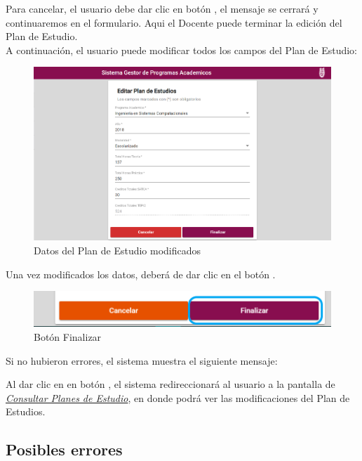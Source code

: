 Para cancelar, el usuario debe dar clic en botón  , el mensaje se cerrará y continuaremos en el formulario. Aqui el Docente puede terminar la edición del Plan de Estudio.\\
A continuación, el usuario puede modificar todos los campos del Plan de Estudio:
\begin{figure}[!hbtp]
	\centering
	\hypertarget{modif}{\includegraphics[width=0.7\linewidth]{images/SP4-GPE/editarPE}}
	\caption{Datos del Plan de Estudio modificados}
	\label{modif}
\end{figure}

Una vez modificados los datos, deberá de dar clic en el botón  .
\begin{figure}[!hbtp]
	\centering
	\hypertarget{btnfin}{\includegraphics[width=0.7\linewidth]{images/SP4-GPE/editarPER}}
	\caption{Botón Finalizar}
	\label{btnfin}
\end{figure}

Si no hubieron errores, el sistema muestra el siguiente mensaje:

Al dar clic en en botón  , el sistema redireccionará al usuario a la pantalla de \hyperlink{consultarPE}{\textit{Consultar Planes de Estudio}}, en donde podrá ver las modificaciones del Plan de Estudios.\\
\newpage
\subsection{Posibles errores}

